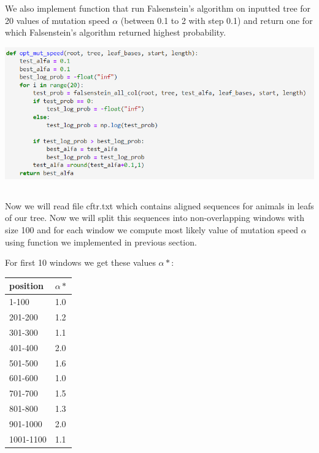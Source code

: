 \documentclass[a4paper]{article}
\begin{document}
	We also implement function that run Falsenstein's algorithm on inputted tree for 20 values of mutation speed $\alpha$ (between 0.1 to 2 with step 0.1) and return one for which Falsenstein's algorithm returned highest probability.
	
	\centerline{\includegraphics[width=1\textwidth]{opt_alfa}} 
	
	\subsection{}
	
	Now we will read file cftr.txt which contains aligned sequences for animals in leafs of our tree. Now we will split this sequences into non-overlapping windows with size 100 and for each window we compute most likely value of mutation speed $\alpha$ using function we implemented in previous section. 
	
	For first 10 windows we get these values $\alpha*$: 
	
	\begin{table}[!h]
		\begin{tabular}{|l|l|}
			\hline
			position  & $\alpha*$\\ \hline
			1-100 & 1.0  \\ \hline
			201-200 & 1.2  \\ \hline
			301-300 & 1.1  \\ \hline
			401-400 & 2.0  \\ \hline
			501-500 & 1.6  \\ \hline
			601-600 & 1.0  \\ \hline
			701-700 & 1.5  \\ \hline
			801-800 & 1.3  \\ \hline
			901-1000 & 2.0  \\ \hline
			1001-1100 & 1.1  \\ \hline
		\end{tabular}
	\end{table}
	
\end{document}
